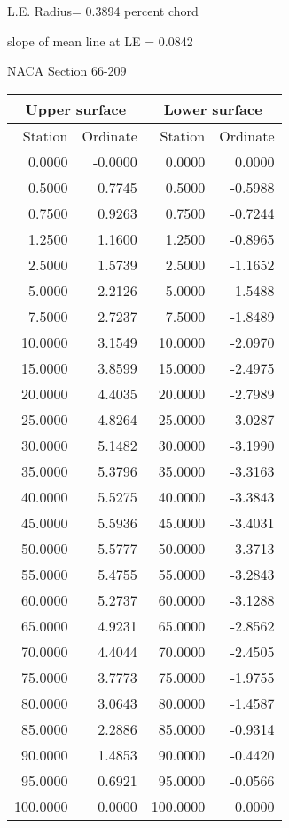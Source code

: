 \documentclass[11pt]{book}
\begin{document}
L.E. Radius=  0.3894 percent chord


 slope of mean line at LE =  0.0842
 \newpage
  \label{s66-209}
 \begin{Large}
 NACA Section 66-209
 \end{Large}
  
 \vspace{8mm}
 \begin{tabular}{|r|r|r|r|} \hline 
 \multicolumn{2}{|c|}{Upper surface} & \multicolumn{2}{|c|}{Lower surface} \\
 \hline
 Station & Ordinate & Station & Ordinate \\
 \hline
0.0000 & -0.0000 & 0.0000 & 0.0000 \\
0.5000 & 0.7745 & 0.5000 & -0.5988 \\
0.7500 & 0.9263 & 0.7500 & -0.7244 \\
1.2500 & 1.1600 & 1.2500 & -0.8965 \\
2.5000 & 1.5739 & 2.5000 & -1.1652 \\
5.0000 & 2.2126 & 5.0000 & -1.5488 \\
7.5000 & 2.7237 & 7.5000 & -1.8489 \\
10.0000 & 3.1549 & 10.0000 & -2.0970 \\
15.0000 & 3.8599 & 15.0000 & -2.4975 \\
20.0000 & 4.4035 & 20.0000 & -2.7989 \\
25.0000 & 4.8264 & 25.0000 & -3.0287 \\
30.0000 & 5.1482 & 30.0000 & -3.1990 \\
35.0000 & 5.3796 & 35.0000 & -3.3163 \\
40.0000 & 5.5275 & 40.0000 & -3.3843 \\
45.0000 & 5.5936 & 45.0000 & -3.4031 \\
50.0000 & 5.5777 & 50.0000 & -3.3713 \\
55.0000 & 5.4755 & 55.0000 & -3.2843 \\
60.0000 & 5.2737 & 60.0000 & -3.1288 \\
65.0000 & 4.9231 & 65.0000 & -2.8562 \\
70.0000 & 4.4044 & 70.0000 & -2.4505 \\
75.0000 & 3.7773 & 75.0000 & -1.9755 \\
80.0000 & 3.0643 & 80.0000 & -1.4587 \\
85.0000 & 2.2886 & 85.0000 & -0.9314 \\
90.0000 & 1.4853 & 90.0000 & -0.4420 \\
95.0000 & 0.6921 & 95.0000 & -0.0566 \\
100.0000 & 0.0000 & 100.0000 & 0.0000 \\
 \hline 
 \end{tabular}
\end{document}
